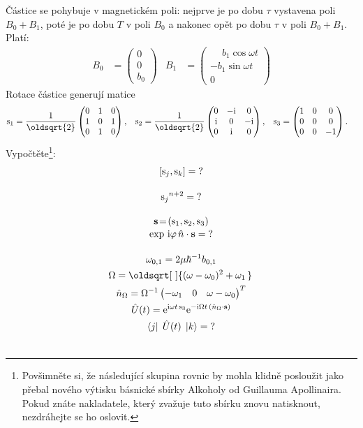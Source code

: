 \documentclass[10pt,a4paper]{article}
\renewcommand*{\sqrt}[2][\ ]{\oldsqrt[#1]{#2\,}\,}
\def\ph{\phantom}
\def\?{\mathit{?}}
\newcommand{\comm}[2]{\left[ #1, #2 \right]}
\newcommand{\const}[1]{\text{#1}}
\newcommand{\mat}[1]{
    \begin{pmatrix}
        #1
    \end{pmatrix}
}
\newcommand{\bra}[1]{\left< #1 \right|}
\newcommand{\ket}[1]{\left| #1 \right>}
\newcommand{\e}[1]{\const{e}^{#1}}
\renewcommand{\i}{\const{i}}
\begin{document}
Částice se pohybuje v magnetickém poli: nejprve je po dobu $\tau$ vystavena poli $B_0+B_1$, poté je po dobu $T$ v poli $B_0$ a nakonec opět po dobu $\tau$ v poli $B_0+B_1$. Platí:
\begin{align*}
    B_0 &= \mat{0 \\ 0 \\ b_0} &
    B_1 &= \mat{
        \ph{-} b_1 \cos \omega t \\
        - b_1 \sin \omega t \\
        0
    }
\end{align*}
Rotace částice generují matice
\begin{align*}
    \const{s}_1 &= \frac{1}{\oldsqrt{2}} \mat{
        0 & 1 & 0 \\
        1 & 0 & 1 \\
        0 & 1 & 0
    },
    &
    \const{s}_2 &= \frac{1}{\oldsqrt{2}} \mat{
        0 & -\i & 0 \\
        \i & 0 & -\i \\
        0 & \i & 0
    },
    &
    \const{s}_3 &= \mat{
        1 & 0 & 0 \\
        0 & 0 & 0 \\
        0 & 0 & -1
    }.
\end{align*}
Vypočtěte\footnote{Povšimněte si, že následující skupina rovnic by mohla klidně posloužit jako přebal nového výtisku básnické sbírky Alkoholy od Guillauma Apollinaira. Pokud znáte nakladatele, který zvažuje tuto sbírku znovu natisknout, nezdráhejte se ho oslovit.}:
\begin{gather*}
    \comm{\const{s}_j}{\const{s}_k} = \?
    \\[10pt]
    {\const{s}_j}^{n+2} = \?
    \\[10pt]
    \mathbf{s}
    \! = \!
    (\const{s}_1, \const{s}_2, \const{s}_3)
    \\[-2pt]
    \exp \, \i \varphi \,
    \hat{n} \cdot \mathbf{s}
    \!\, = \!\, \?
    \\[10pt]
    \omega_{0,1} = 2 \mu \hbar^{-1} b_{0,1}
    \\
    \Omega = \sqrt{(\omega-\omega_0)^2 + \omega_1}
    \\
    \hat{n}_\Omega = \Omega^{-1}
    \mat{ -\omega_1 & 0 & \omega-\omega_0 }^T
    \\
    \hat{U}(t) =
    \e{\i \omega t \, \const{s}_3}
    \e{-\i \Omega t \, ( \hat{n}_\Omega \cdot \mathbf{s} )}
    \\
    \bra{j} \; \hat{U}(t) \; \ket{k} = \?
    \\
    \\
\end{gather*}
\end{document}
